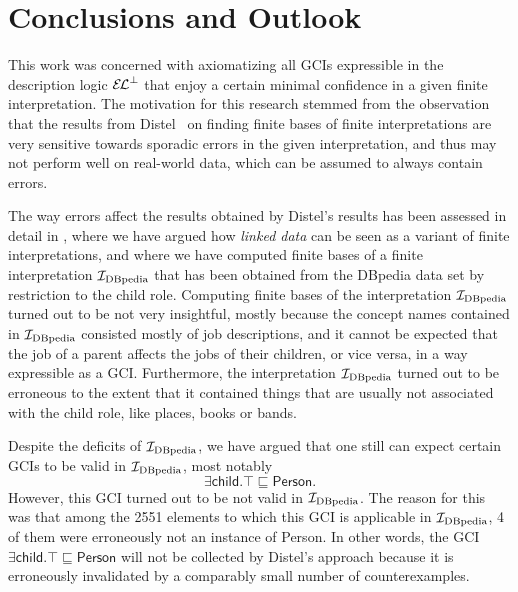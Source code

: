 \chapter{Conclusions and Outlook}
\label{cha:conclusions}

This work was concerned with axiomatizing all GCIs expressible in the description logic
${{\mathcal{E}\kern-.3ex\mathcal{L}}^\bot}$ that enjoy a certain minimal confidence in a given finite interpretation.  The
motivation for this research stemmed from the observation that the results from
Distel~\cite{Diss-Felix} on finding finite bases of finite interpretations are very
sensitive towards sporadic errors in the given interpretation, and thus may not perform
well on real-world data, which can be assumed to always contain errors.

The way errors affect the results obtained by Distel's results has been assessed in detail
in , where we have argued how \emph{linked data} can be
seen as a variant of finite interpretations, and where we have computed finite bases of a
finite interpretation ${\mathcal{I}_{\text{DBpedia}}}$ that has been obtained from the DBpedia data set by
restriction to the \textsf{child} role.  Computing finite bases of the interpretation
${\mathcal{I}_{\text{DBpedia}}}$ turned out to be not very insightful, mostly because the concept names
contained in ${\mathcal{I}_{\text{DBpedia}}}$ consisted mostly of job descriptions, and it cannot be expected
that the job of a parent affects the jobs of their children, or vice versa, in a way
expressible as a GCI.  Furthermore, the interpretation ${\mathcal{I}_{\text{DBpedia}}}$ turned out to be
erroneous to the extent that it contained things that are usually not associated with the
\textsf{child} role, like places, books or bands.

Despite the deficits of ${\mathcal{I}_{\text{DBpedia}}}$, we have argued that one still can expect certain GCIs
to be valid in ${\mathcal{I}_{\text{DBpedia}}}$, most notably
\begin{equation*}
  \exists \mathsf{child}. \top \sqsubseteq \mathsf{Person}.
\end{equation*}
However, this GCI turned out to be not valid in ${\mathcal{I}_{\text{DBpedia}}}$.  The reason for this was that
among the 2551 elements to which this GCI is applicable in ${\mathcal{I}_{\text{DBpedia}}}$, 4 of them were
erroneously not an instance of \textsf{Person}.  In other words, the GCI $\exists
\mathsf{child}. \top \sqsubseteq \mathsf{Person}$ will not be collected by Distel's
approach because it is erroneously invalidated by a comparably small number of
counterexamples.

